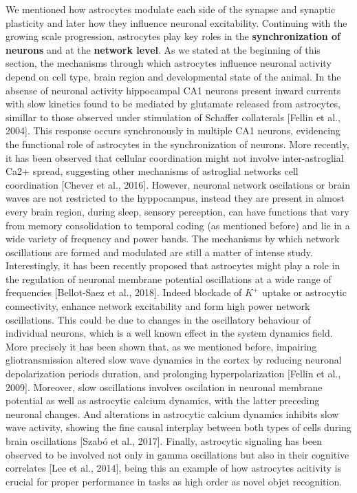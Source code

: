 We mentioned how astrocytes modulate each side of the synapse and synaptic plasticity and later how they influence neuronal excitability. 
Continuing with the growing scale progression, astrocytes play key roles in the \textbf{synchronization of neurons} and at the \textbf{network level}.
As we stated at the beginning of this section, the mechanisms through which astrocytes influence neuronal activity depend on cell type, brain region and developmental state of the animal.
In the absense of neuronal activity hippocampal CA1 neurons present inward currents with slow kinetics found to be mediated by glutamate released from astrocytes, simillar to those observed under stimulation of Schaffer collaterals [Fellin et al., 2004].
This response occurs synchronously in multiple CA1 neurons, evidencing the functional role of astrocytes in the synchronization of neurons.
More recently, it has been observed that cellular coordination might not involve inter-astroglial Ca2+ spread, suggesting other mechanisms of astroglial networks cell coordination [Chever et al., 2016]. 
However, neuronal network oscilations or brain waves are not restricted to the hyppocampus, instead they are present in almost every brain region, during sleep, sensory perception, can have functions that vary from memory consolidation to temporal coding (as mentioned before) and lie in a wide variety of frequency and power bands.   
The mechanisms by which network oscillations are formed and modulated are still a matter of intense study.
Interestingly, it has been recently proposed that astrocytes might play a role in the regulation of neuronal membrane potential oscillations at a wide range of frequencies [Bellot-Saez et al., 2018].
Indeed blockade of $K^+$ uptake or astrocytic connectivity, enhance network excitability and form high power network oscillations.
This could be due to changes in the oscillatory behaviour of individual neurons, which is a well known effect in the system dynamics field.
More precisely it has been shown that, as we mentioned before, impairing gliotransmission altered slow wave dynamics in the cortex by reducing neuronal depolarization periods duration, and prolonging hyperpolarization [Fellin et al., 2009].
Moreover, slow oscillations involves oscilation in neuronal membrane potential as well as astrocytic calcium dynamics, with the latter preceding neuronal changes.  
And alterations in astrocytic calcium dynamics inhibits slow wave activity, showing the fine causal interplay between both types of cells during brain oscillations [Szabó et al., 2017].
Finally, astrocytic signaling has been observed to be involved not only in gamma oscillations but also in their cognitive correlates [Lee et al., 2014], being this an example of how astrocytes acitivity is crucial for proper performance in tasks as high order as novel objet recognition.

